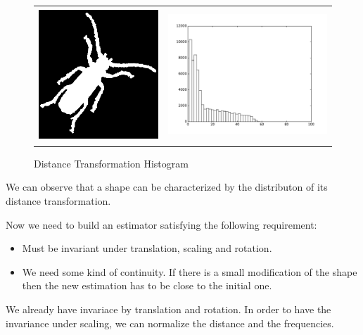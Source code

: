 \documentclass[a4paper, 11pt]{article}
\begin{document}
\begin{figure}[h!]
\begin{tabular}{ll}
\includegraphics[width=5cm]{beetle.png} &
\includegraphics[height=5cm]{beetle-dthist.pdf} \\
\end{tabular}
\caption{Distance Transformation Histogram}
\end{figure}

\noindent We can observe that a shape can be characterized by the distributon of its distance transformation.

\noindent Now we need to build an estimator satisfying the following requirement:
\begin{itemize}
	\item Must be invariant under translation, scaling and rotation.
	\item We need some kind of continuity. If there is a small modification of the shape then the new estimation has to be close to the initial one.
\end{itemize}
We already have invariace by translation and rotation. In order to have the invariance under scaling, we can normalize the distance and the frequencies.
\end{document}

